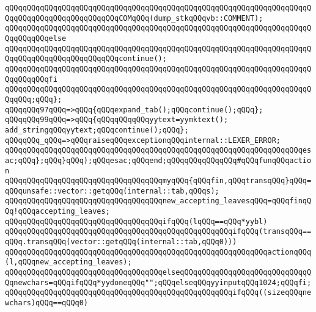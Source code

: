 \verb|qQQqqQQqqQQqqQQqqQQqqQQqqQQqqQQqqQQqqQQqqQQqqQQqqQQqqQQqqQQqqQQqqQQqqQQqqQQqqQQqqQQqqQQqqQQqqQQqCOMqQQq(dump_stkqQQqvb::COMMENT);|\newline
\verb|qQQqqQQqqQQqqQQqqQQqqQQqqQQqqQQqqQQqqQQqqQQqqQQqqQQqqQQqqQQqqQQqqQQqqQQqqQQqqQQqelse|\newline
\verb|qQQqqQQqqQQqqQQqqQQqqQQqqQQqqQQqqQQqqQQqqQQqqQQqqQQqqQQqqQQqqQQqqQQqqQQqqQQqqQQqqQQqqQQqqQQqqQQqcontinue();|\newline
\verb|qQQqqQQqqQQqqQQqqQQqqQQqqQQqqQQqqQQqqQQqqQQqqQQqqQQqqQQqqQQqqQQqqQQqqQQqqQQqqQQqfi|\newline
\verb|qQQqqQQqqQQqqQQqqQQqqQQqqQQqqQQqqQQqqQQqqQQqqQQqqQQqqQQqqQQqqQQqqQQqqQQqqQQq;qQQq};|\newline
\verb|qQQqqQQq97qQQq=>qQQq{qQQqexpand_tab();qQQqcontinue();qQQq};|\newline
\verb|qQQqqQQq99qQQq=>qQQq{qQQqqQQqqQQqyytext=yymktext();|\newline
\verb|add_stringqQQqyytext;qQQqcontinue();qQQq};|\newline
\verb|qQQqqQQq_qQQq=>qQQqraiseqQQqexceptionqQQqinternal::LEXER_ERROR;|\newline
\newline
\verb|qQQqqQQqqQQqqQQqqQQqqQQqqQQqqQQqqQQqqQQqqQQqqQQqqQQqqQQqqQQqqQQqqQQqesac;qQQq};qQQq}qQQq);qQQqesac;qQQqend;qQQqqQQqqQQqqQQq#qQQqfunqQQqaction|\newline
\newline
\verb|qQQqqQQqqQQqqQQqqQQqqQQqqQQqqQQqqQQqmyqQQq{qQQqfin,qQQqtransqQQq}qQQq=qQQqunsafe::vector::getqQQq(internal::tab,qQQqs);|\newline
\verb|qQQqqQQqqQQqqQQqqQQqqQQqqQQqqQQqqQQqnew_accepting_leavesqQQq=qQQqfinqQQq!qQQqaccepting_leaves;|\newline
\verb|qQQqqQQqqQQqqQQqqQQqqQQqqQQqqQQqqQQqifqQQq(lqQQq==qQQq*yybl)|\newline
\verb|qQQqqQQqqQQqqQQqqQQqqQQqqQQqqQQqqQQqqQQqqQQqqQQqqQQqifqQQq(transqQQq==qQQq.transqQQq(vector::getqQQq(internal::tab,qQQq0)))|\newline
\verb|qQQqqQQqqQQqqQQqqQQqqQQqqQQqqQQqqQQqqQQqqQQqqQQqqQQqqQQqqQQqactionqQQq(l,qQQqnew_accepting_leaves);|\newline
\verb|qQQqqQQqqQQqqQQqqQQqqQQqqQQqqQQqqQQqelseqQQqqQQqqQQqqQQqqQQqqQQqqQQqqQQqnewchars=qQQqifqQQq*yydoneqQQq"";qQQqelseqQQqyyinputqQQq1024;qQQqfi;|\newline
\verb|qQQqqQQqqQQqqQQqqQQqqQQqqQQqqQQqqQQqqQQqqQQqqQQqqQQqifqQQq((sizeqQQqnewchars)qQQq==qQQq0)|\newline
